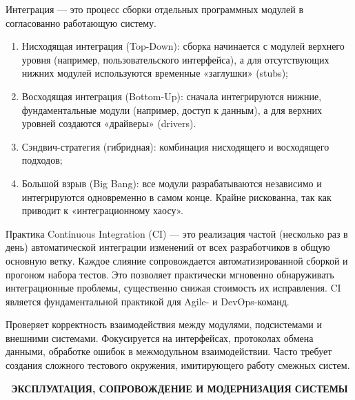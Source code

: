 \documentclass{SibFU-docs}
\begin{document}

Интеграция — это процесс сборки отдельных программных модулей в согласованно работающую систему.

\begin{enumerate}
    \item Нисходящая интеграция (Top-Down): сборка начинается с модулей верхнего уровня (например, пользовательского интерфейса), а для отсутствующих нижних модулей используются временные «заглушки» (stubs);
    \item Восходящая интеграция (Bottom-Up): сначала интегрируются нижние, фундаментальные модули (например, доступ к данным), а для верхних уровней создаются «драйверы» (drivers).
    \item Сэндвич-стратегия (гибридная): комбинация нисходящего и восходящего подходов;
    \item Большой взрыв (Big Bang): все модули разрабатываются независимо и интегрируются одновременно в самом конце. Крайне рискованна, так как приводит к «интеграционному хаосу».
\end{enumerate}


Практика Continuous Integration (CI) — это реализация частой (несколько раз в день) автоматической интеграции изменений от всех разработчиков в общую основную ветку. Каждое слияние сопровождается автоматизированной сборкой и прогоном набора тестов. Это позволяет практически мгновенно обнаруживать интеграционные проблемы, существенно снижая стоимость их исправления. CI является фундаментальной практикой для Agile- и DevOps-команд. \cite{sommerville2016se}


Проверяет корректность взаимодействия между модулями, подсистемами и внешними системами. Фокусируется на интерфейсах, протоколах обмена данными, обработке ошибок в межмодульном взаимодействии. Часто требует создания сложного тестового окружения, имитирующего работу смежных систем.


\newpage
{}
\begin{center}\textbf{\thesection\ ЭКСПЛУАТАЦИЯ, СОПРОВОЖДЕНИЕ И МОДЕРНИЗАЦИЯ СИСТЕМЫ}\end{center}
\vspace*{-1.5em}
\end{document}
